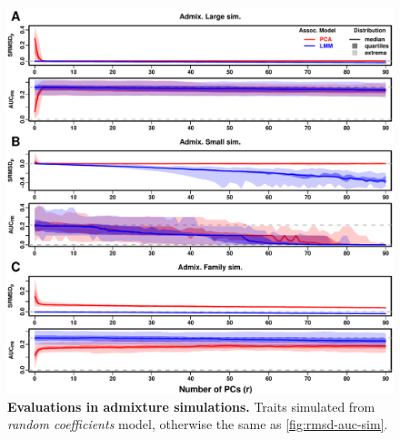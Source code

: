 \documentclass[11pt]{article}
\begin{document}
\begin{figure}[bp!]
  \centering
  \includegraphics[width=\textwidth,height=\textheight,keepaspectratio]{rmsd-auc-sim.pdf}
  \caption{
    {\small 
      {\bf Evaluations in admixture simulations.}
      Traits simulated from \textit{random coefficients} model, otherwise the same as \cref{fig:rmsd-auc-sim}.
    }
  }
  \label{fig:rmsd-auc-sim-rc}
\end{figure}
\end{document}
